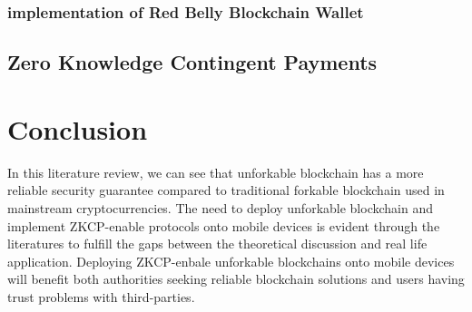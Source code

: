 \documentclass[12pt]{article}
\begin{document}
\subsubsection{implementation of Red Belly Blockchain Wallet}


\subsection{Zero Knowledge Contingent Payments}


\section{Conclusion}

In this literature review, we can see that unforkable blockchain has a more reliable security guarantee compared to traditional forkable blockchain used in mainstream cryptocurrencies. The need to deploy unforkable blockchain and implement ZKCP-enable protocols onto mobile devices is evident through the literatures to fulfill the gaps between the theoretical discussion and real life application. Deploying ZKCP-enbale unforkable blockchains onto mobile devices will benefit both authorities seeking reliable blockchain solutions and users having trust problems with third-parties.

\newpage


\end{document}
